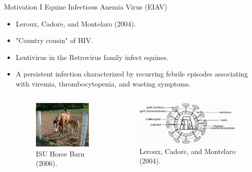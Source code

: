 \documentclass{beamer}
\begin{document}
\begin{frame}{Motivation I}
Equine Infectious Anemia Virus (EIAV)
\begin{itemize}
\item Leroux, Cador$\acute{\mbox{e}}$, and Montelaro (2004).
\item "Country cousin" of HIV.
\item Lentivirus in the Retrovirus family infect equines.
\item A persistent infection characterized by
      recurring febrile episodes associating with viremia,
      thrombocytopenia, and wasting symptoms.

\begin{columns}

\begin{column}{0.4\textwidth}
  \begin{figure}
  \includegraphics[width=\textwidth]{./graph/pony}
  \\
  {\tiny ISU Horse Barn (2006).}
  \end{figure}
\end{column}

\hspace{-0.2cm}

\begin{column}{0.7\textwidth}
  \begin{figure}
  \includegraphics[width=\textwidth]{./graph/eiav_virus}
  \\
  {\tiny Leroux, Cador$\acute{\mbox{e}}$, and Montelaro (2004).}
  \end{figure}
\end{column}


\end{columns}
\end{itemize}
\end{frame}
\end{document}
